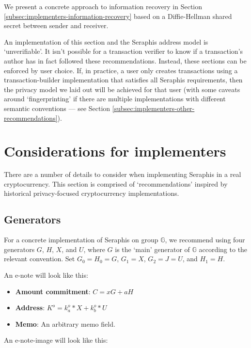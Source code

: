 We present a concrete approach to information recovery in Section \ref{subsec:implementers-information-recovery} based on a Diffie-Hellman shared secret between sender and receiver.

An implementation of this section and the Seraphis address model is `unverifiable'. It isn't possible for a transaction verifier to know if a transaction's author has in fact followed these recommendations. Instead, these sections can be enforced by user choice. If, in practice, a user only creates transactions using a transaction-builder implementation that satisfies all Seraphis requirements, then the privacy model we laid out will be achieved for that user (with some caveats around `fingerprinting' if there are multiple implementations with different semantic conventions --- see Section \ref{subsec:implementers-other-recommendations}).



\section{Considerations for implementers}
\label{sec:considerations-implementers}

There are a number of details to consider when implementing Seraphis in a real cryptocurrency. This section is comprised of `recommendations' inspired by historical privacy-focused cryptocurrency implementations.


\subsection{Generators}
\label{subsec:implementers-generators}

For a concrete implementation of Seraphis on group $\mathbb{G}$, we recommend using four generators $G$, $H$, $X$, and $U$, where $G$ is the `main' generator of $\mathbb{G}$ according to the relevant convention. Set $G_0 = H_0 = G$, $G_1 = X$, $G_2 = J = U$, and $H_1 = H$.

An e-note will look like this:

\begin{itemize}
    \item \textbf{Amount commitment}: $C = x G + a H$
    \item \textbf{Address}: $K^o = k^o_a*X + k^o_b*U$
    \item \textbf{Memo}: An arbitrary memo field.
\end{itemize}

An e-note-image will look like this:

